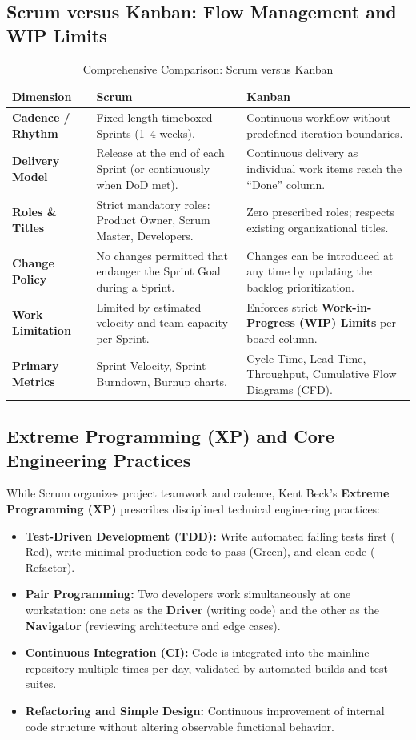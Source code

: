 \subsection{Scrum versus Kanban: Flow Management and WIP Limits}
\begin{table}[htbp]
\centering
\small
\caption{Comprehensive Comparison: Scrum versus Kanban}
\label{tab:scrum_vs_kanban}
\begin{tabularx}{\textwidth}{l p{5cm} X}
\toprule
\textbf{Dimension} & \textbf{Scrum} & \textbf{Kanban} \\
\midrule
\textbf{Cadence / Rhythm} & Fixed-length timeboxed Sprints (1--4 weeks). & Continuous workflow without predefined iteration boundaries. \\
\textbf{Delivery Model} & Release at the end of each Sprint (or continuously when DoD met). & Continuous delivery as individual work items reach the ``Done'' column. \\
\textbf{Roles \& Titles} & Strict mandatory roles: Product Owner, Scrum Master, Developers. & Zero prescribed roles; respects existing organizational titles. \\
\textbf{Change Policy} & No changes permitted that endanger the Sprint Goal during a Sprint. & Changes can be introduced at any time by updating the backlog prioritization. \\
\textbf{Work Limitation} & Limited by estimated velocity and team capacity per Sprint. & Enforces strict \textbf{Work-in-Progress (WIP) Limits} per board column. \\
\textbf{Primary Metrics} & Sprint Velocity, Sprint Burndown, Burnup charts. & Cycle Time, Lead Time, Throughput, Cumulative Flow Diagrams (CFD). \\
\bottomrule
\end{tabularx}
\end{table}

\subsection{Extreme Programming (XP) and Core Engineering Practices}
While Scrum organizes project teamwork and cadence, Kent Beck's \textbf{Extreme Programming (XP)} prescribes disciplined technical engineering practices:
\begin{itemize}
    \item \textbf{Test-Driven Development (TDD):} Write automated failing tests first ($\text{Red}$), write minimal production code to pass ($\text{Green}$), and clean code ($\text{Refactor}$).
    \item \textbf{Pair Programming:} Two developers work simultaneously at one workstation: one acts as the \textbf{Driver} (writing code) and the other as the \textbf{Navigator} (reviewing architecture and edge cases).
    \item \textbf{Continuous Integration (CI):} Code is integrated into the mainline repository multiple times per day, validated by automated builds and test suites.
    \item \textbf{Refactoring and Simple Design:} Continuous improvement of internal code structure without altering observable functional behavior.
\end{itemize}

